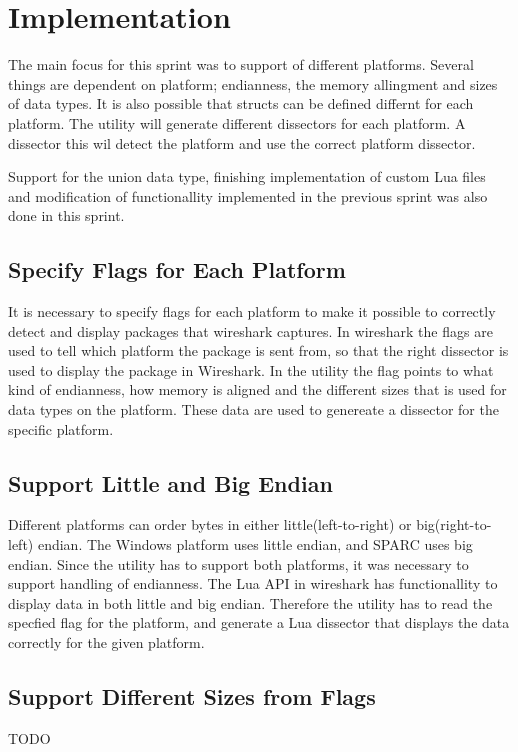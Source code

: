 \section{Implementation}
The main focus for this sprint was to support of different platforms. Several 
things are dependent on platform; endianness, the memory allingment and sizes 
of data types. It is also possible that structs can be defined differnt for 
each platform. The utility will generate different dissectors for each 
platform. A dissector this wil detect the platform and use the correct 
platform dissector.

Support for the union data type, finishing implementation of custom Lua files 
and modification of functionallity implemented in the previous sprint was also 
done in this sprint.

\subsection{Specify Flags for Each Platform}
It is necessary to specify flags for each platform to make it possible to 
correctly detect and display packages that wireshark captures. In wireshark 
the flags are used to tell which platform the package is sent from, so that 
the right dissector is used to display the package in Wireshark. In the 
utility the flag points to what kind of endianness, how memory is aligned and 
the different sizes that is used for data types on the platform. These data 
are used to genereate a dissector for the specific platform.

\subsection{Support Little and Big Endian}
Different platforms can order bytes in either little(left-to-right) or 
big(right-to-left) endian. The Windows platform uses little endian, and SPARC 
uses big endian. Since the utility has to support both platforms, it was 
necessary to support handling of endianness. The Lua API in wireshark has 
functionallity to display data in both little and big endian. Therefore the 
utility has to read the specfied flag for the platform, and generate a Lua 
dissector that displays the data correctly for the given platform.

\subsection{Support Different Sizes from Flags}
TODO

